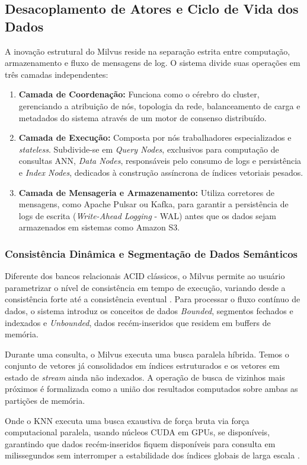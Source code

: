 \documentclass[a4paper, 12pt]{article} %
\begin{document}
\subsection{Desacoplamento de Atores e Ciclo de Vida dos Dados}
A inovação estrutural do Milvus reside na separação estrita entre computação, armazenamento e fluxo de mensagens de log. O sistema divide suas operações em três camadas independentes:
\begin{enumerate}
    \item \textbf{Camada de Coordenação:} Funciona como o cérebro do cluster, gerenciando a atribuição de nós, topologia da rede, balanceamento de carga e metadados do sistema através de um motor de consenso distribuído.
    \item \textbf{Camada de Execução:} Composta por nós trabalhadores especializados e \textit{stateless}. Subdivide-se em \textit{Query Nodes}, exclusivos para computação de consultas ANN, \textit{Data Nodes}, responsáveis pelo consumo de logs e persistência e \textit{Index Nodes}, dedicados à construção assíncrona de índices vetoriais pesados.
    \item \textbf{Camada de Mensageria e Armazenamento:} Utiliza corretores de mensagens, como Apache Pulsar ou Kafka, para garantir a persistência de logs de escrita (\textit{Write-Ahead Logging} - WAL) antes que os dados sejam armazenados em sistemas como Amazon S3.
\end{enumerate}

\subsubsection{Consistência Dinâmica e Segmentação de Dados Semânticos}
Diferente dos bancos relacionais ACID clássicos, o Milvus permite ao usuário parametrizar o nível de consistência em tempo de execução, variando desde a consistência forte até a consistência eventual \cite{Mivus}. Para processar o fluxo contínuo de dados, o sistema introduz os conceitos de dados \textit{Bounded}, segmentos fechados e indexados e \textit{Unbounded}, dados recém-inseridos que residem em buffers de memória.

Durante uma consulta, o Milvus executa uma busca paralela híbrida. Temos o conjunto de vetores já consolidados em índices estruturados e  os vetores em estado de \textit{stream} ainda não indexados. A operação de busca de vizinhos mais próximos é formalizada como a união dos resultados computados sobre ambas as partições de memória.

Onde o KNN executa uma busca exaustiva de força bruta via força computacional paralela, usando núcleos CUDA em GPUs, se disponíveis, garantindo que dados recém-inseridos fiquem disponíveis para consulta em milissegundos sem interromper a estabilidade dos índices globais de larga escala \cite{Mivus}.
\end{document}
